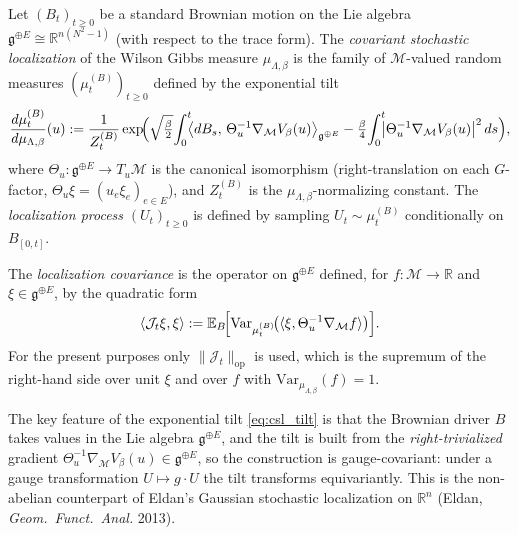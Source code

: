 \begin{definition}
\label{def:csl_process}
Let $(B_{t})_{t\ge 0}$ be a standard Brownian motion on the Lie algebra
$\mathfrak{g}^{\oplus E}\cong\mathbb{R}^{n(N^{2}-1)}$ (with respect to
the trace form). The \emph{covariant stochastic localization} of the
Wilson Gibbs measure $\mu_{\Lambda,\beta}$ is the family of
$\mathcal{M}$-valued random measures $(\mu_{t}^{(B)})_{t\ge 0}$ defined
by the exponential tilt
\begin{equation}
\label{eq:csl_tilt}
  \frac{d\mu_{t}^{(B)}}{d\mu_{\Lambda,\beta}}(u)
  := \frac{1}{Z_{t}^{(B)}}
  \exp\!\Bigl(
    \sqrt{\tfrac{\beta}{2}}\!\int_{0}^{t}\!\!
      \bigl\langle dB_{s},\, \Theta_{u}^{-1}\nabla_{\mathcal{M}}V_{\beta}(u)\bigr\rangle_{\mathfrak{g}^{\oplus E}}
    - \tfrac{\beta}{4}\!\int_{0}^{t}\!\!
      \bigl|\Theta_{u}^{-1}\nabla_{\mathcal{M}}V_{\beta}(u)\bigr|^{2}\,ds
  \Bigr),
\end{equation}
where $\Theta_{u}:\mathfrak{g}^{\oplus E}\to T_{u}\mathcal{M}$ is the
canonical isomorphism (right-translation on each $G$-factor,
$\Theta_{u}\xi = (u_{e}\xi_{e})_{e\in E}$), and
$Z_{t}^{(B)}$ is the $\mu_{\Lambda,\beta}$-normalizing constant. The
\emph{localization process} $(U_{t})_{t\ge 0}$ is defined by sampling
$U_{t}\sim\mu_{t}^{(B)}$ conditionally on $B_{[0,t]}$.

The \emph{localization covariance} is the operator on
$\mathfrak{g}^{\oplus E}$ defined, for $f:\mathcal{M}\to\mathbb{R}$
and $\xi\in\mathfrak{g}^{\oplus E}$, by the quadratic form
\begin{equation}
\label{eq:Jt_def}
  \langle\mathcal{J}_{t}\xi,\xi\rangle
  := \mathbb{E}_{B}\!\Bigl[
    \mathrm{Var}_{\mu_{t}^{(B)}}\!\bigl(\langle\xi,\Theta_{u}^{-1}\nabla_{\mathcal{M}}f\rangle\bigr)
  \Bigr].
\end{equation}
For the present purposes only $\|\mathcal{J}_{t}\|_{\mathrm{op}}$ is
used, which is the supremum of the right-hand side over unit
$\xi$ and over $f$ with $\mathrm{Var}_{\mu_{\Lambda,\beta}}(f)=1$.
\end{definition}

The key feature of the exponential tilt \eqref{eq:csl_tilt} is that
the Brownian driver $B$ takes values in the Lie algebra
$\mathfrak{g}^{\oplus E}$, and the tilt is built from the
\emph{right-trivialized} gradient
$\Theta_{u}^{-1}\nabla_{\mathcal{M}}V_{\beta}(u)\in\mathfrak{g}^{\oplus E}$,
so the construction is gauge-covariant: under a gauge transformation
$U\mapsto g\cdot U$ the tilt transforms equivariantly. This is the
non-abelian counterpart of Eldan's Gaussian stochastic localization
on $\mathbb{R}^{n}$ (Eldan, \emph{Geom.\ Funct.\ Anal.} 2013).

